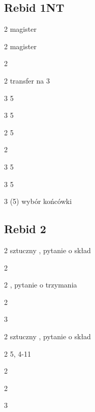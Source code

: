 \documentclass[12pt, a4paper]{article}
\begin{document}
\subsection*{Rebid 1NT}
\begin{options}[2]
    \item[2\clubs] magister
    \item[2\diams] magister
    \item[2\hearts] \soff
    \item[2\nt] transfer na 3\clubs \vimp
    \item[3\clubs] 5\clubs \gf \imp
    \item[3\diams] 5\diams \gf \imp
\end{options}

\begin{options}[2]
    \item[2\hearts] 5\hearts \inv
    \item[2\nt] \bal \inv 
    \item[3\clubs] 5\clubs \inv
    \item[3\diams] 5\diams \inv
    \item[3\nt] (5) wybór końcówki \vimp
\end{options}



\pagebreak
\subsection*{Rebid 2\clubs}

\sequence{{1\clubs}{1\hearts}{2\clubs}}
\begin{options}[2]
    \item[2\diams] sztuczny \gf, pytanie o skład \vimp
    \item[2\hearts] \soff
    \item[2\spades] \gf, pytanie o trzymania
    \item[2\nt] \inv 
    \item[3\clubs] \inv 
\end{options}

\sequence{{1\clubs}{1\spades}{2\clubs}}
\begin{options}[2]
    \item[2\diams] sztuczny \gf, pytanie o skład \vimp
    \item[2\hearts] 5\spades, 4-11 \inv
    \item[2\spades] \soff
    \item[2\nt] \inv
    \item[3\clubs] \inv 
\end{options}
\end{document}
